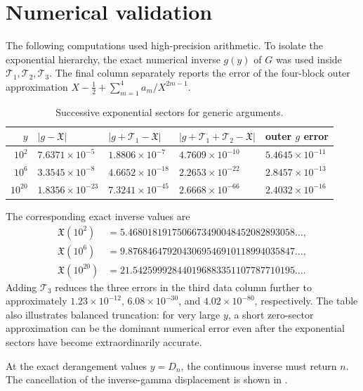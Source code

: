 \documentclass[11pt,oneside]{article}
\theoremstyle{plain}
\theoremstyle{definition}
\theoremstyle{remark}
\newcommand{\Xfrak}{\mathfrak{X}}
\newcommand{\Tcal}{\mathcal{T}}
\newcommand{\abs}[1]{\left\lvert#1\right\rvert}
\begin{document}
\section{Numerical validation}
\label{sec:numerics}

The following computations used high-precision arithmetic.  To isolate the
exponential hierarchy, the exact numerical inverse \(g(y)\) of \(G\) was used
inside \(\Tcal_1,\Tcal_2,\Tcal_3\).  The final column separately reports the
error of the four-block outer approximation
\(X-\tfrac12+\sum_{m=1}^4a_m/X^{2m-1}\).

\begin{table}[htbp]
\centering
\small
\caption{Successive exponential sectors for generic arguments.}
\label{tab:generic-numerics}
\begin{tabular}{@{}rllll@{}}
\toprule
\(y\) & \(\abs{g-\Xfrak}\) &
\(\abs{g+\Tcal_1-\Xfrak}\) &
\(\abs{g+\Tcal_1+\Tcal_2-\Xfrak}\) &
outer \(g\) error \\
\midrule
\(10^2\)  & \(7.6371\times10^{-5}\)  & \(1.8806\times10^{-7}\) &
\(4.7609\times10^{-10}\) & \(5.4645\times10^{-11}\) \\
\(10^6\)  & \(3.3545\times10^{-8}\)  & \(4.6652\times10^{-18}\) &
\(2.2653\times10^{-22}\) & \(2.8457\times10^{-13}\) \\
\(10^{20}\) & \(1.8356\times10^{-23}\) & \(7.3241\times10^{-45}\) &
\(2.6668\times10^{-66}\) & \(2.4032\times10^{-16}\) \\
\bottomrule
\end{tabular}
\end{table}

The corresponding exact inverse values are
\begin{align*}
 \Xfrak(10^2)&=5.4680181917506673490048452082893058\ldots,\\
 \Xfrak(10^6)&=9.8768464792043069546910118994035847\ldots,\\
 \Xfrak(10^{20})&=21.542599928440196883351107787710195\ldots.
\end{align*}
Adding \(\Tcal_3\) reduces the three errors in the third data column further
to approximately \(1.23\times10^{-12}\), \(6.08\times10^{-30}\), and
\(4.02\times10^{-80}\), respectively.  The table also illustrates balanced
truncation: for very large \(y\), a short zero-sector approximation can be the
dominant numerical error even after the exponential sectors have become
extraordinarily accurate.

At the exact derangement values \(y=D_n\), the continuous inverse must return
\(n\).  The cancellation of the inverse-gamma displacement is shown in
.
\end{document}

